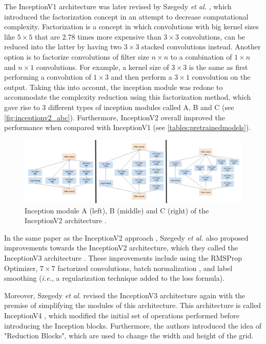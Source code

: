     The InceptionV1 architecture was later revised by Szegedy \textit{et al.} \cite{inceptionv3}, which introduced the factorization concept in an attempt to decrease computational complexity. Factorization is a concept in which convolutions with big kernel sizes like $5 \times 5$ that are 2.78 times more expensive than $3 \times 3$ convolutions, can be reduced into the latter by having two $3 \times 3$ stacked convolutions instead. Another option is to factorize convolutions of filter size $n \times n$ to a combination of $1 \times n$ and $n \times 1$ convolutions. For example, a kernel size of $3 \times 3$ is the same as first performing a convolution of $1 \times 3$ and then perform a $3 \times 1$ convolution on the output. Taking this into account, the inception module was redone to accommodate the complexity reduction using this factorization method, which gave rise to 3 different types of inception modules called A, B and C (see \autoref{fig:inceptionv2_abc}). Furthermore, InceptionV2 overall improved the performance when compared with InceptionV1 (see \autoref{tables:pretrainedmodels}). 
    
    \begin{figure}[ht]
      \centering
        \includegraphics[width=\linewidth]{figs/inceptionv2_abc.jpeg}
      \caption{Inception module A (left), B (middle) and C (right) of the InceptionV2 architecture \cite{inceptionv3}.}
      \label{fig:inceptionv2_abc}
    \end{figure}
    
    In the same paper as the InceptionV2 approach \cite{inceptionv3}, Szegedy \textit{et al.} also proposed improvements towards the InceptionV2 architecture, which they called the InceptionV3 architecture \cite{inceptionv3}. These improvements include using the RMSProp Optimizer, $7 \times 7$ factorized convolutions, batch normalization \cite{batchnorm}, and label smoothing (\textit{i.e.}, a regularization technique added to the loss formula). \par
    
    Moreover, Szegedy \textit{et al.} revised the InceptionV3 architecture again with the premise of simplifying the modules of this architecture. This architecture is called InceptionV4 \cite{inceptionv4}, which modified the initial set of operations performed before introducing the Inception blocks. Furthermore, the authors introduced the idea of "Reduction Blocks", which are used to change the width and height of the grid. \par
    
